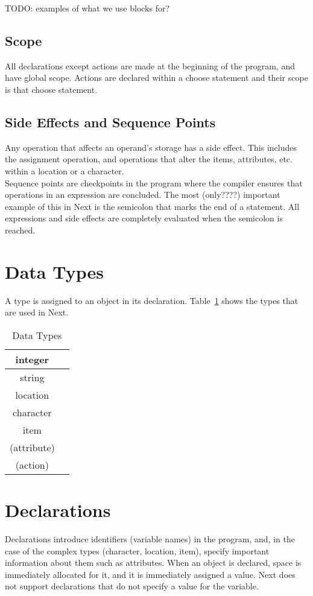 \documentclass[12pt]{article}
\begin{document}
TODO: examples of what we use blocks for?

\subsection{Scope}
All declarations except actions are made at the beginning of the program, and have global scope.  Actions are declared within a choose statement and their scope is that choose statement.

\subsection{Side Effects and Sequence Points}
Any operation that affects an operand's storage has a side effect.  This includes the assignment operation, and operations that alter the items, attributes, etc. within a location or a character. \\

\noindent Sequence points are checkpoints in the program where the compiler ensures that operations in an expression are concluded.  The most (only????) important example of this in Next is the semicolon that marks the end of a statement.  All expressions and side effects are completely evaluated when the semicolon is reached.


\section{Data Types}
A type is assigned to an object in its declaration.  Table~\ref{types} shows the types that are used in Next.

\begin{table}[htdp]
\caption{Data Types}
\begin{center}
\begin{tabular}{|c|c|}
\hline
integer \\
\hline
string \\
\hline
location \\
\hline
character \\
\hline
item \\
\hline
(attribute) \\
\hline
(action) \\
\hline
\end{tabular}
\end{center}
\label{types}
\end{table}%

\section{Declarations}
Declarations introduce identifiers (variable names) in the program, and, in the case of the complex types (character, location, item), specify important information about them such as attributes.  When an object is declared, space is immediately allocated for it, and it is immediately assigned a value.  Next does not support declarations that do not specify a value for the variable.
\end{document}
